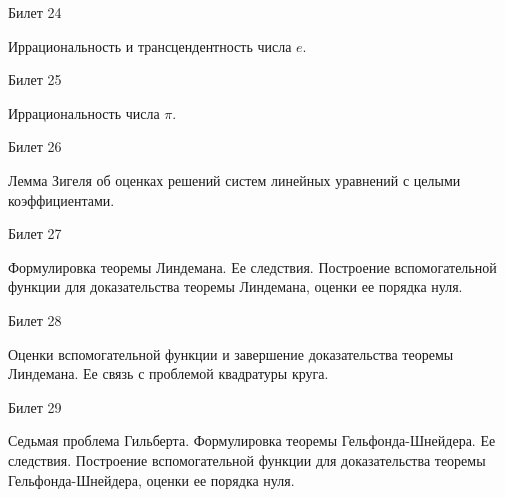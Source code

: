 \documentclass[a4paper,12pt]{article}
\begin{document}
\newpage
\begin{mybox2}{\hypertarget{bil24}{Билет 24}}

\begin{formbox}{}
Иррациональность и трансцендентность числа $e$.
\end{formbox}

\end{mybox2}

\newpage
\begin{mybox}{\hypertarget{bil25}{Билет 25}}

\begin{formbox}{}
Иррациональность числа $\pi$.
\end{formbox}

\end{mybox}

\newpage
\begin{mybox2}{\hypertarget{bil26}{Билет 26}}

\begin{formbox}{}
Лемма Зигеля об оценках решений систем линейных уравнений с целыми коэффициентами.
\end{formbox}

\end{mybox2}

\newpage
\begin{mybox}{\hypertarget{bil27}{Билет 27}}

\begin{formbox}{}
Формулировка теоремы Линдемана. Ее следствия. Построение вспомогательной функции для доказательства теоремы Линдемана, оценки ее порядка нуля.
\end{formbox}

\end{mybox}

\newpage
\begin{mybox2}{\hypertarget{bil28}{Билет 28}}

\begin{formbox}{}
Оценки вспомогательной функции и завершение доказательства теоремы Линдемана. Ее связь с проблемой квадратуры круга.
\end{formbox}

\end{mybox2}

\newpage
\begin{mybox}{\hypertarget{bil29}{Билет 29}}

\begin{formbox}{}
Седьмая проблема Гильберта. Формулировка теоремы Гельфонда-Шнейдера. Ее следствия. Построение вспомогательной функции для доказательства теоремы Гельфонда-Шнейдера, оценки ее порядка нуля.
\end{formbox}

\end{mybox}
\end{document}
